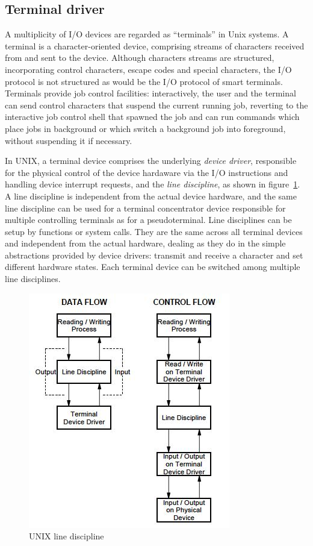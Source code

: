 \subsection{Terminal driver}
A multiplicity of I/O devices are regarded as ``terminals'' in Unix systems. A terminal is a character-oriented device, comprising streams of characters received from and sent to the device. Although characters streams are structured, incorporating control characters, escape codes and special characters, the I/O protocol is not structured as would be the I/O protocol of smart terminals. Terminals provide job control facilities: interactively, the user and the terminal can send control characters that suspend the current running job, reverting to the interactive job control shell that spawned the job and can run commands which place jobs in background or which switch a background job into foreground, without suspending it if necessary.

In UNIX, a terminal device comprises the underlying \emph{device driver}, responsible for the physical control of the device hardaware via the I/O instructions and handling device interrupt requests, and the \emph{line discipline}, as shown in figure~\ref{unix_line_discipline}. A line discipline is independent from the actual device hardware, and the same line discipline can be used for a terminal concentrator device responsible for multiple controlling terminals as for a pseudoterminal. Line disciplines can be setup by functions or system calls. They are the same across all terminal devices and independent from the actual hardware, dealing as they do in the simple abstractions provided by device drivers: transmit and receive a character and set different hardware states. Each terminal device can be switched among multiple line disciplines.

\begin{figure}[hbtp]
\centering
\includegraphics[scale=0.6]{images/device_management/unix_line_discipline.jpg}
\caption{UNIX line discipline}
\label{unix_line_discipline}
\end{figure}

